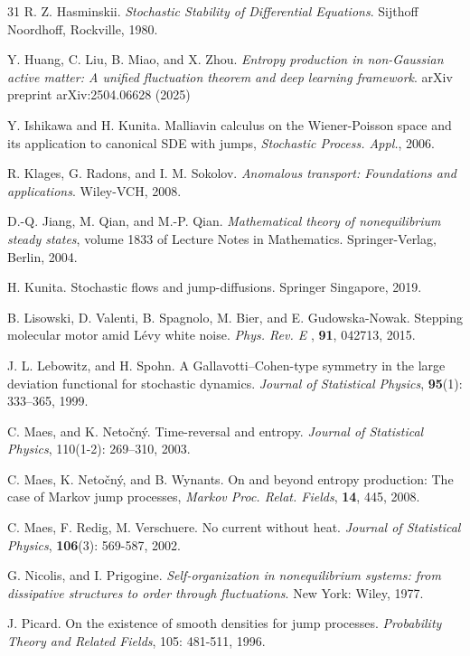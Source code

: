 \documentclass[10pt]{article}
\theoremstyle{definition}
\theoremstyle{remark}
\numberwithin{equation}{section}
\begin{document}
\begin{thebibliography}{31}
  R. Z. Hasminskii. {\it Stochastic Stability of Differential Equations}. Sijthoff  Noordhoff, Rockville, 1980.

 Y. Huang, C. Liu, B. Miao, and X. Zhou. {\it  Entropy production in non-Gaussian active matter: A unified fluctuation theorem and deep learning framework}. arXiv preprint arXiv:2504.06628 (2025)

 Y. Ishikawa and H. Kunita.  Malliavin calculus on the Wiener-Poisson space and its application to canonical SDE with jumps,  {\it Stochastic Process. Appl.}, 2006.

 R. Klages, G. Radons, and I. M. Sokolov. {\it Anomalous transport: Foundations and applications}. Wiley-VCH, 2008.

 D.-Q. Jiang, M. Qian, and M.-P. Qian. {\it Mathematical theory of nonequilibrium steady states}, volume 1833 of Lecture Notes in Mathematics. Springer-Verlag, Berlin, 2004.

 H. Kunita. Stochastic flows and jump-diffusions. Springer Singapore, 2019.

 B. Lisowski, D. Valenti, B. Spagnolo, M.  Bier, and E. Gudowska-Nowak. Stepping molecular motor amid L\'{e}vy white noise. {\it Phys. Rev. E }, {\bf 91}, 042713, 2015.

 J. L. Lebowitz, and H. Spohn. A Gallavotti–Cohen-type symmetry in the large deviation functional for stochastic dynamics. {\it Journal of Statistical Physics}, \textbf{95}(1): 333–365, 1999.

 C. Maes, and K. Netočný. Time-reversal and entropy. {\it Journal of Statistical Physics}, 110(1-2): 269–310, 2003.

 C. Maes, K. Netočný, and B. Wynants. On and beyond entropy production: The case of Markov jump
processes, {\it Markov Proc. Relat. Fields}, {\bf 14}, 445, 2008.

 C. Maes, F. Redig, M. Verschuere. No current without heat. {\it Journal of Statistical Physics}, \textbf{106}(3): 569-587, 2002.


 G. Nicolis, and I. Prigogine. {\it Self-organization in nonequilibrium systems: from dissipative structures to order through fluctuations}. New York: Wiley,  1977.

 J. Picard. On the existence of smooth densities for jump processes. {\it Probability Theory and Related Fields}, 105: 481-511, 1996.


\end{thebibliography}
\end{document}
